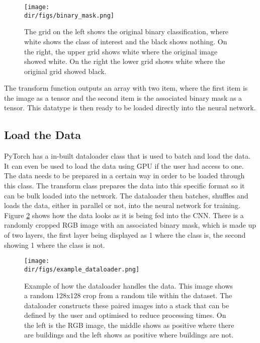 \begin{figure}[H]
    \centering
    \texttt{[image: \\dir/figs/binary\_mask.png]}
    \caption[Binary Mask]{The grid on the left shows the original binary classification, where white shows the class of interest and the black shows nothing. On the right, the upper grid shows white where the original image showed white. On the right the lower grid shows white where the original grid showed black.}
    \label{fig.binary_mask}
\end{figure}
The transform function outputs an array with two item, where the first item is the image as a tensor and the second item is the associated binary mask as a tensor. This datatype is then ready to be loaded directly into the neural network.
\subsection{Load the Data}
PyTorch has a in-built dataloader class that is used to batch and load the data. It can even be used to load the data using GPU if the user had access to one. The data needs to be prepared in a certain way in order to be loaded through this class. The transform class prepares the data into this specific format so it can be bulk loaded into the network. The dataloader then batches, shuffles and loads the data, either in parallel or not, into the neural network for training. Figure \ref{fig.dataloader} shows how the data looks as it is being fed into the CNN. There is a randomly cropped RGB image with an associated binary mask, which is made up of two layers, the first layer being displayed as 1 where the class is, the second showing 1 where the class is not. 
\begin{figure}[H]
    \centering
    \texttt{[image: \\dir/figs/example\_dataloader.png]}
    \caption[Example of how the dataloader handles the data]{Example of how the dataloader handles the data. This image shows a random 128x128 crop from a random tile within the dataset. The dataloader constructs these paired images into a stack that can be defined by the user and optimised to reduce processing times. On the left is the RGB image, the middle shows as positive where there are buildings and the left shows as positive where buildings are not.}
    \label{fig.dataloader}
\end{figure}
